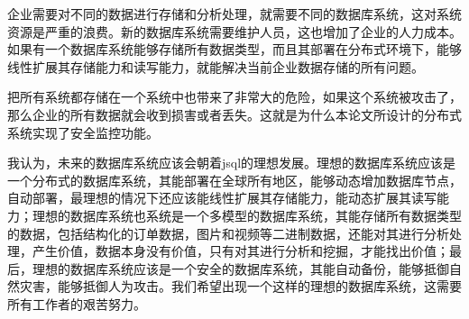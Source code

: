 企业需要对不同的数据进行存储和分析处理，就需要不同的数据库系统，这对系统资源是严重的浪费。新的数据库系统需要维护人员，这也增加了企业的人力成本。如果有一个数据库系统能够存储所有数据类型，而且其部署在分布式环境下，能够线性扩展其存储能力和读写能力，就能解决当前企业数据存储的所有问题。

把所有系统都存储在一个系统中也带来了非常大的危险，如果这个系统被攻击了，那么企业的所有数据就会收到损害或者丢失。这就是为什么本论文所设计的分布式系统实现了安全监控功能。

我认为，未来的数据库系统应该会朝着jsql的理想发展。理想的数据库系统应该是一个分布式的数据库系统，其能部署在全球所有地区，能够动态增加数据库节点，自动部署，最理想的情况下还应该能线性扩展其存储能力，能动态扩展其读写能力；理想的数据库系统也系统是一个多模型的数据库系统，其能存储所有数据类型的数据，包括结构化的订单数据，图片和视频等二进制数据，还能对其进行分析处理，产生价值，数据本身没有价值，只有对其进行分析和挖掘，才能找出价值；最后，理想的数据库系统应该是一个安全的数据库系统，其能自动备份，能够抵御自然灾害，能够抵御人为攻击。我们希望出现一个这样的理想的数据库系统，这需要所有工作者的艰苦努力。